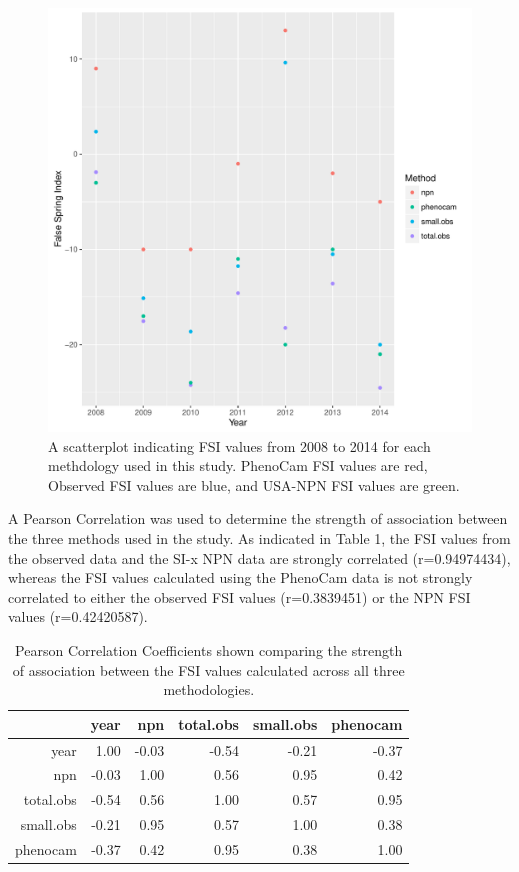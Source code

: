 \documentclass{article}\usepackage[]{graphicx}\usepackage[]{color}
\makeatletter
\def\maxwidth{ %
  \ifdim\Gin@nat@width>\linewidth
    \linewidth
  \else
    \Gin@nat@width
  \fi
}
\makeatother
\begin{document}
\begin{figure}[H]
\includegraphics[width=\maxwidth]{figure/fsifig-1} \caption[A scatterplot indicating FSI values from 2008 to 2014 for each methdology used in this study]{A scatterplot indicating FSI values from 2008 to 2014 for each methdology used in this study. PhenoCam FSI values are red, Observed FSI values are blue, and USA-NPN FSI values are green.}\label{fig:fsifig}
\end{figure}



A Pearson Correlation was used to determine the strength of association between the three methods used in the study. As indicated in Table 1, the FSI values from the observed data and the SI-x NPN data are strongly correlated (r=0.94974434), whereas the FSI values calculated using the PhenoCam data is not strongly correlated to either the observed FSI values (r=0.3839451) or the NPN FSI values (r=0.42420587).

\begin{table}[ht]
\centering
\caption{Pearson Correlation Coefficients shown comparing the strength of association between the FSI values calculated across all three methodologies.} 
\begin{tabular}{rrrrrr}
  \hline
 & year & npn & total.obs & small.obs & phenocam \\ 
  \hline
year & 1.00 & -0.03 & -0.54 & -0.21 & -0.37 \\ 
  npn & -0.03 & 1.00 & 0.56 & 0.95 & 0.42 \\ 
  total.obs & -0.54 & 0.56 & 1.00 & 0.57 & 0.95 \\ 
  small.obs & -0.21 & 0.95 & 0.57 & 1.00 & 0.38 \\ 
  phenocam & -0.37 & 0.42 & 0.95 & 0.38 & 1.00 \\ 
   \hline
\end{tabular}
\end{table}
\end{document}
